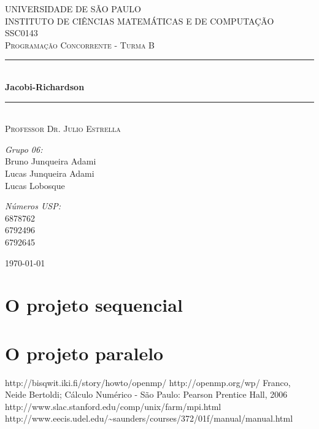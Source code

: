 \documentclass[a4paper]{article}
\newcommand{\HRule}{\rule{\linewidth}{0.5mm}}
\begin{document}
\begin{titlepage}
\begin{center}	

\textsc{\Large UNIVERSIDADE DE SÃO PAULO\\
	INSTITUTO DE CIÊNCIAS MATEMÁTICAS E DE COMPUTAÇÃO}\\[0.7cm]

\textsc{\Large SSC0143}\\[0.2cm]
\textsc{\Large Programação Concorrente - Turma B}\\[0.5cm]

\HRule \\[0.4cm]
{ \huge \bfseries Jacobi-Richardson}\\[0.4cm]
\HRule \\[0.4cm]
\textsc{Professor Dr. Julio Estrella}\\[1.5cm]

\begin{minipage}{0.4\textwidth}
\begin{flushleft} \large
\emph{Grupo 06:}\\
Bruno Junqueira Adami\\
Lucas Junqueira Adami\\
Lucas Lobosque\\
\end{flushleft}
\end{minipage}
\begin{minipage}{0.4\textwidth}
\begin{flushright} \large
\emph{Números USP:}\\
6878762\\
6792496\\
6792645\\
\end{flushright}
\end{minipage}

\vfill

{\large \today}
	
\end{center}
\end{titlepage}

\section{O projeto sequencial}

\section{O projeto paralelo}

\begin{thebibliography}{99}
	 http://bisqwit.iki.fi/story/howto/openmp/
	 http://openmp.org/wp/
	 Franco, Neide Bertoldi; Cálculo Numérico - São Paulo: Pearson Prentice Hall, 2006
	 http://www.slac.stanford.edu/comp/unix/farm/mpi.html
	 http://www.eecis.udel.edu/\~{}saunders/courses/372/01f/manual/manual.html
\end{thebibliography}
\end{document}
